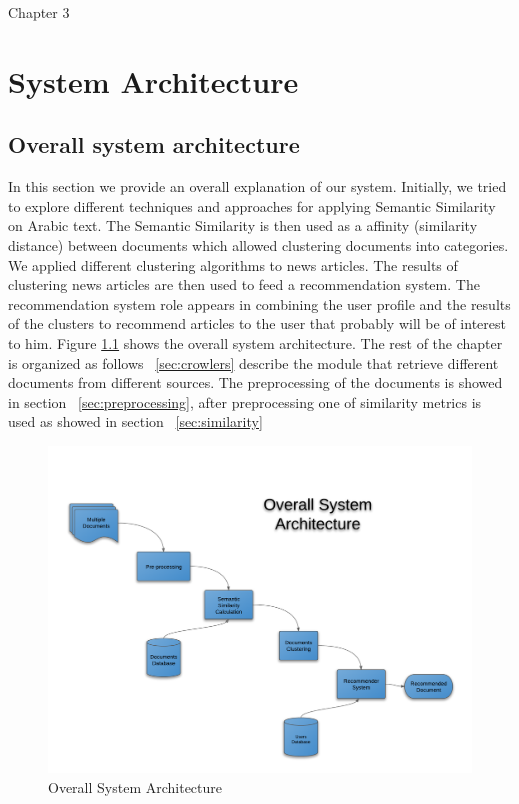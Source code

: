 Chapter 3

\chapter{System Architecture} %

\label{sysArch} %


\section{Overall system architecture}
In this section we provide an overall explanation of our system.  Initially, we tried to explore different techniques and approaches for applying Semantic Similarity on Arabic text. The Semantic Similarity is then used as a affinity (similarity distance) between documents which allowed clustering documents into categories. We applied different clustering algorithms to news articles. The results of clustering news articles are then used to feed a recommendation system. The recommendation system role appears in combining the user profile and the results of the clusters to recommend articles to the user that probably will be of interest to him. Figure \ref{fig:arch_1} shows the overall system architecture.
The rest of the chapter is organized as follows ~\ref{sec:crowlers} describe the module that retrieve different documents from different sources. The preprocessing of the documents is showed in section ~\ref{sec:preprocessing}, after preprocessing one of similarity metrics is used as showed in section ~\ref{sec:similarity}

\begin{figure}[htb]
\begin{center}
\includegraphics[totalheight=.5\textheight,
width=.5\textwidth]{./Figures/arch_1.png}
\end{center}
\caption{Overall System Architecture}
\label{fig:arch_1}
\end{figure}



